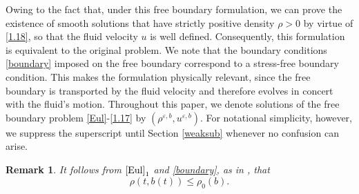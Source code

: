 \documentclass[reqno,11pt]{amsart}
\numberwithin{equation}{section}
\newtheorem{remark}[theorem]{Remark}
\theoremstyle{definition}
\def\v{\varepsilon}
\begin{document}
   Owing to the fact that, under this free boundary formulation, 
   we can prove the existence of smooth solutions that have strictly positive density $\rho > 0$ 
   by virtue of \eqref{1.18}, so that the fluid velocity $u$ is well defined.
   Consequently, this formulation is equivalent to the original problem.
   We note that the boundary conditions \eqref{boundary} imposed on the free boundary correspond to 
   a stress-free boundary condition. This makes the formulation physically relevant, since the free
   boundary is transported by the fluid velocity and therefore evolves in concert with the fluid's motion.
   Throughout this paper, we denote solutions of the free boundary problem \eqref{Eul}-\eqref{1.17} by $(\rho^{\v,b},u^{\v,b})$.
   For notational simplicity, however, we suppress the superscript until Section \ref{weaksub} 
   whenever no confusion can arise.

  \begin{remark}
  It follows from $\eqref{Eul}_1$ and \eqref{boundary}, as in {\rm\cite{Chen2021}}, that
    \begin{equation*}
      \rho(t,b(t)) \leq \rho_0(b).
    \end{equation*}
    \end{remark}
\end{document}
